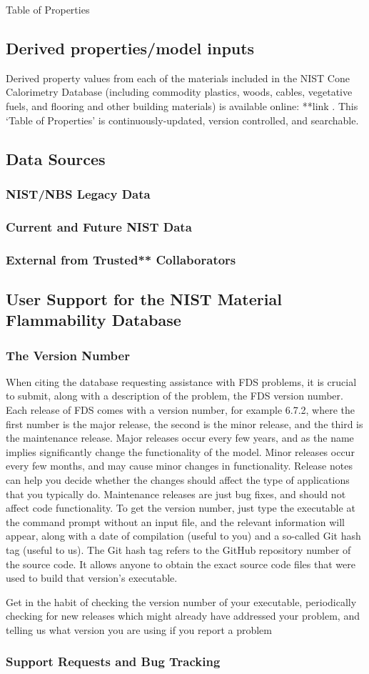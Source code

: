 Table of Properties
\subsection{Derived properties/model inputs} \label{ssec:DB-properties}
Derived property values from each of the materials included in the NIST Cone Calorimetry Database (including commodity plastics, woods, cables, vegetative fuels, and flooring and other building materials) is available online: **link . This `Table of Properties' is continuously-updated, version controlled, and searchable.

\subsection{Data Sources} \label{ssec:DB-Data}
\subsubsection{NIST/NBS Legacy Data}
\subsubsection{Current and Future NIST Data}
\subsubsection{External from Trusted** Collaborators} 


\subsection{User Support for the NIST Material Flammability Database} \label{ssec:MFDB-support}
\subsubsection{The Version Number}
When citing the database 
requesting assistance with FDS problems, it is crucial to submit, along with a description of the problem, the FDS version number. Each release of FDS comes with a version number, for example 6.7.2, where the first number is the major release, the second is the minor release, and the third is the maintenance release. Major releases occur every few years, and as the name implies significantly change the functionality of the model. Minor releases occur every few months, and may cause minor changes in functionality. Release notes can help you decide whether the changes should affect the type of applications that you typically do. Maintenance releases are just bug fixes, and should not affect code functionality. To get the version number, just type the executable at the command prompt without an input file, and the relevant information will appear, along with a date of compilation (useful to you) and a so-called Git hash tag (useful to us). The Git hash tag refers to the GitHub repository number of the source code. It allows anyone to obtain the exact source code files that were used to build that version’s executable.

Get in the habit of checking the version number of your executable, periodically checking for new releases which might already have addressed your problem, and telling us what version you are using if you report a problem

\subsubsection{Support Requests and Bug Tracking}
